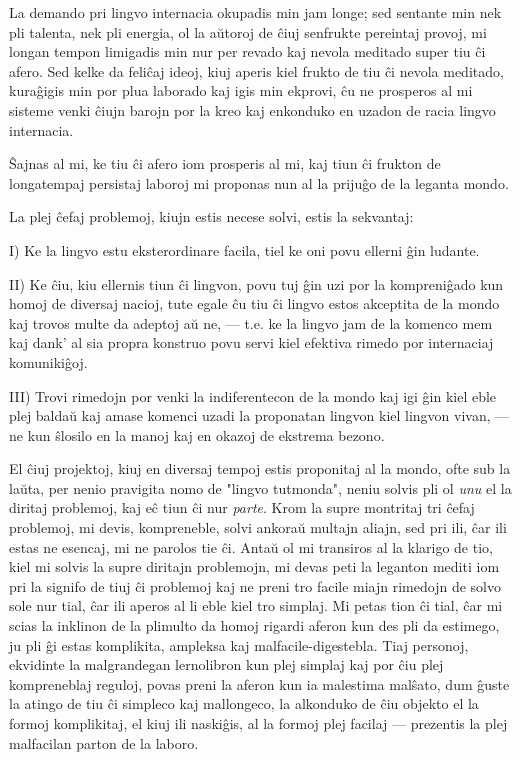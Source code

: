    La demando pri lingvo internacia okupadis min jam longe; sed sentante
min nek pli talenta, nek pli energia, ol la a\u utoroj de \^ciuj
senfrukte pereintaj provoj, mi longan tempon limigadis min nur per
revado kaj nevola meditado super tiu \^ci afero. Sed kelke da
feli\^caj ideoj, kiuj aperis kiel frukto de tiu \^ci nevola
meditado, kura\^gigis min por plua laborado kaj igis min ekprovi,
\^cu ne prosperos al mi sisteme venki \^ciujn barojn por la kreo kaj
enkonduko en uzadon de racia lingvo internacia.

   \^Sajnas al mi, ke tiu \^ci afero iom prosperis al mi, kaj tiun \^ci
frukton de longatempaj persistaj laboroj mi proponas nun al la
priju\^go de la leganta mondo.

   La plej \^cefaj problemoj, kiujn estis necese solvi, estis la
sekvantaj:

   I) Ke la lingvo estu eksterordinare facila, tiel ke oni povu ellerni
\^gin ludante.

   II) Ke \^ciu, kiu ellernis tiun \^ci lingvon, povu tuj \^gin uzi por
la kompreni\^gado kun homoj de diversaj nacioj, tute egale \^cu tiu
\^ci lingvo estos akceptita de la mondo kaj trovos multe da adeptoj
a\u u ne, --- t.e. ke la lingvo jam de la komenco mem kaj dank' al
sia propra konstruo povu servi kiel efektiva rimedo por internaciaj
komuniki\^goj.

   III) Trovi rimedojn por venki la indiferentecon de la mondo kaj
igi \^gin kiel eble plej balda\u u kaj amase komenci uzadi la
proponatan lingvon kiel lingvon vivan, --- ne kun \^slosilo en la
manoj kaj en okazoj de ekstrema bezono.

   El \^ciuj projektoj, kiuj en diversaj tempoj estis proponitaj al
la mondo, ofte sub la la\u uta, per nenio pravigita nomo de "lingvo
tutmonda", neniu solvis pli ol {\sl unu} el la diritaj problemoj,
kaj e\^c tiun \^ci nur {\sl parte}. Krom la supre montritaj tri
\^cefaj problemoj, mi devis, kompreneble, solvi ankora\u u multajn
aliajn, sed pri ili, \^car ili estas ne esencaj, mi ne parolos tie
\^ci. Anta\u u ol mi transiros al la klarigo de tio, kiel mi solvis
la supre diritajn problemojn, mi devas peti la leganton mediti iom
pri la signifo de tiuj \^ci problemoj kaj ne preni tro facile miajn
rimedojn de solvo sole nur tial, \^car ili aperos al li eble kiel
tro simplaj. Mi petas tion \^ci tial, \^car mi scias la inklinon de
la plimulto da homoj rigardi aferon kun des pli da estimego, ju pli
\^gi estas komplikita, ampleksa kaj malfacile-digestebla. Tiaj
personoj, ekvidinte la malgrandegan lernolibron kun plej simplaj kaj
por \^ciu plej kompreneblaj reguloj, povas preni la aferon kun ia
malestima mal\^sato, dum \^guste la atingo de tiu \^ci simpleco kaj
mallongeco, la alkonduko de \^ciu objekto el la formoj komplikitaj,
el kiuj ili naski\^gis, al la formoj plej facilaj --- prezentis la
plej malfacilan parton de la laboro.

